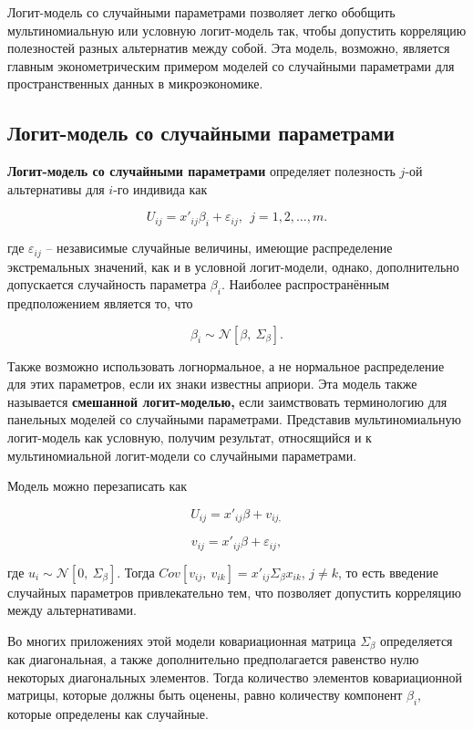 Логит-модель со случайными параметрами позволяет легко обобщить мультиномиальную или условную логит-модель так, чтобы допустить корреляцию полезностей разных альтернатив между собой. Эта модель, возможно, является главным эконометрическим примером моделей со случайными параметрами для пространственных данных в микроэкономике.

\subsection{Логит-модель со случайными параметрами}

\textbf{Логит-модель со случайными параметрами }  определяет полезность $j$-ой альтернативы для $i$-го индивида как

\begin{equation} \label{GrindEQ__15_39_} U_{ij}=x'_{ij}{\beta }_i+{\varepsilon }_{ij},\ \ j=1,2,\dots ,m. \end{equation} 

где ${\varepsilon }_{ij}$ -- независимые случайные величины, имеющие распределение экстремальных значений, как и в условной логит-модели, однако, дополнительно допускается случайность параметра ${\beta }_i$. Наиболее распространённым предположением является то, что 

\begin{equation} \label{GrindEQ__15_40_} {\beta }_i\sim {\mathcal N}\left[\beta ,\ {\Sigma }_{\beta }\right]. \end{equation} 

Также возможно использовать логнормальное, а не нормальное распределение для этих параметров, если их знаки известны априори. Эта модель также называется \textbf{смешанной логит-моделью, }если заимствовать терминологию для панельных моделей со случайными параметрами. Представив мультиномиальную логит-модель как условную, получим результат, относящийся и к мультиномиальной логит-модели со случайными параметрами.

Модель можно перезаписать как

\[U_{ij}=x'_{ij}\beta +v_{ij,}\] 

\[v_{ij}=x'_{ij}\beta +{\varepsilon }_{ij},\] 

где $u_i\sim {\mathcal N}\left[0,\ {\Sigma }_{\beta }\right].$ Тогда $Cov\left[v_{ij},\ v_{ik}\right]=x'_{ij}{\Sigma }_{\beta }x_{ik}$, $j\ne k$, то есть введение случайных параметров привлекательно тем, что позволяет допустить корреляцию между альтернативами.

Во многих приложениях этой модели ковариационная матрица ${\Sigma }_{\beta }$ определяется как диагональная, а также дополнительно предполагается  равенство нулю некоторых диагональных элементов. Тогда количество элементов ковариационной матрицы, которые должны быть оценены, равно количеству компонент ${\beta }_i$, которые определены как случайные.

